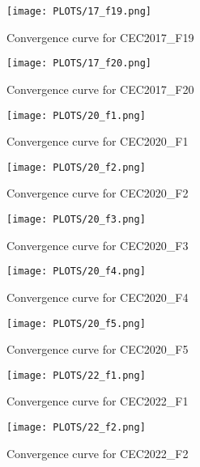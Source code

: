 \documentclass[12pt]{article}
\begin{document}
\begin{figure}[H]
    \centering
    \texttt{[image: PLOTS/17\_f19.png]}
    \caption{Convergence curve for CEC2017\_F19}
    \label{fig:conv_cec2017_f19}
\end{figure}

\begin{figure}[H]
    \centering
    \texttt{[image: PLOTS/17\_f20.png]}
    \caption{Convergence curve for CEC2017\_F20}
    \label{fig:conv_cec2017_f20}
\end{figure}
\begin{figure}[H]
    \centering
    \texttt{[image: PLOTS/20\_f1.png]}
    \caption{Convergence curve for CEC2020\_F1}
    \label{fig:convergence_2020_f1}
\end{figure}

\begin{figure}[H]
    \centering
    \texttt{[image: PLOTS/20\_f2.png]}
    \caption{Convergence curve for CEC2020\_F2}
    \label{fig:convergence_2020_f2}
\end{figure}

\begin{figure}[H]
    \centering
    \texttt{[image: PLOTS/20\_f3.png]}
    \caption{Convergence curve for CEC2020\_F3}
    \label{fig:convergence_2020_f3}
\end{figure}

\begin{figure}[H]
    \centering
    \texttt{[image: PLOTS/20\_f4.png]}
    \caption{Convergence curve for CEC2020\_F4}
    \label{fig:convergence_2020_f4}
\end{figure}

\begin{figure}[H]
    \centering
    \texttt{[image: PLOTS/20\_f5.png]}
    \caption{Convergence curve for CEC2020\_F5}
    \label{fig:convergence_2020_f5}
\end{figure}

\begin{figure}[H]
    \centering
    \texttt{[image: PLOTS/22\_f1.png]}
    \caption{Convergence curve for CEC2022\_F1}
    \label{fig:convergence_2022_f1}
\end{figure}

\begin{figure}[H]
    \centering
    \texttt{[image: PLOTS/22\_f2.png]}
    \caption{Convergence curve for CEC2022\_F2}
    \label{fig:convergence_2022_f2}
\end{figure}
\end{document}
